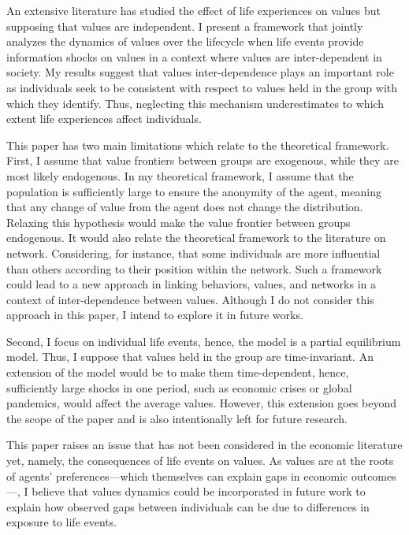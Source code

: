 An extensive literature has studied the effect of life experiences on values but supposing that values are independent. I present a framework that jointly analyzes the dynamics of values over the lifecycle when life events provide information shocks on values in a context where values are inter-dependent in society. My results suggest that values inter-dependence plays an important role as individuals seek to be consistent with respect to values held in the group with which they identify. Thus, neglecting this mechanism underestimates to which extent life experiences affect individuals.

This paper has two main limitations which relate to the theoretical framework. First, I assume that value frontiers between groups are exogenous, while they are most likely endogenous. In my theoretical framework, I assume that the population is sufficiently large to ensure the anonymity of the agent, meaning that any change of value from the agent does not change the distribution. Relaxing this hypothesis would make the value frontier between groups endogenous. It would also relate the theoretical framework to the literature on network. Considering, for instance, that some individuals are more influential than others according to their position within the network. Such a framework could lead to a new approach in linking behaviors, values, and networks in a context of inter-dependence between values. Although I do not consider this approach in this paper, I intend to explore it in future works.

Second, I focus on individual life events, hence, the model is a partial equilibrium model. Thus, I suppose that values held in the group are time-invariant. An extension of the model would be to make them time-dependent, hence, sufficiently large shocks in one period, such as economic crises or global pandemics, would affect the average values. However, this extension goes beyond the scope of the paper and is also intentionally left for future research.

This paper raises an issue that has not been considered in the economic literature yet, namely, the consequences of life events on values. As values are at the roots of agents' preferences---which themselves can explain gaps in economic outcomes---, I believe that values dynamics could be incorporated in future work to explain how observed gaps between individuals can be due to differences in exposure to life events. 